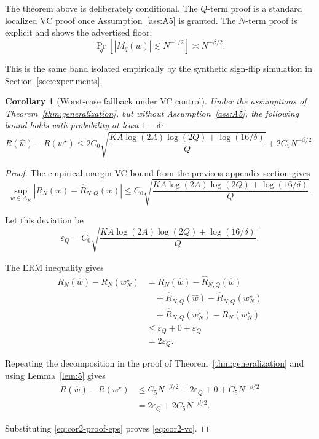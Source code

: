 \documentclass{article} %
\newtheorem{corollary}[theorem]{Corollary}
\providecommand{\simplex}{\Delta_K}
\providecommand{\Risk}{R}
\providecommand{\what}{\widehat{w}}
\providecommand{\wstar}{w^{\star}}
\begin{document}
The theorem above is deliberately conditional.  The \(Q\)-term proof is a
standard localized VC proof once Assumption~\ref{ass:A5} is granted.  The
\(N\)-term proof is explicit and shows the advertised floor:
\begin{equation}
\label{eq:app2-floor-summary}
\Pr_q\!\left[|M_q(w)|\lesssim N^{-1/2}\right]
\asymp
N^{-\beta/2}.
\end{equation}

This is the same band isolated empirically by the synthetic sign-flip simulation
in Section~\ref{sec:experiments}.

\begin{corollary}[Worst-case fallback under VC control]
\label{cor:app2-vc-fallback}
Under the assumptions of Theorem~\ref{thm:generalization}, but without
Assumption~\ref{ass:A5}, the following bound holds with probability at least
\(1-\delta\):
\begin{equation}
\label{eq:cor2-vc}
\Risk(\what)-\Risk(\wstar)
\le
2C_0
\sqrt{
\frac{
KA\log(2A)\log(2Q)+\log(16/\delta)
}{Q}
}
+
2C_5N^{-\beta/2}.
\end{equation}
\end{corollary}

\begin{proof}
The empirical-margin VC bound from the previous appendix section gives
\begin{equation}
\label{eq:cor2-proof-vc}
\sup_{w\in\simplex}
|\Risk_N(w)-\widehat{\Risk}_{N,Q}(w)|
\le
C_0
\sqrt{
\frac{
KA\log(2A)\log(2Q)+\log(16/\delta)
}{Q}
}.
\end{equation}

Let this deviation be
\begin{equation}
\label{eq:cor2-proof-eps}
\varepsilon_Q
=
C_0
\sqrt{
\frac{
KA\log(2A)\log(2Q)+\log(16/\delta)
}{Q}
}.
\end{equation}

The ERM inequality gives
\begin{align}
\Risk_N(\what)-\Risk_N(w_N^\star)
&=
\Risk_N(\what)-\widehat{\Risk}_{N,Q}(\what)
\label{eq:cor2-proof-a}
\\
&\quad+
\widehat{\Risk}_{N,Q}(\what)-\widehat{\Risk}_{N,Q}(w_N^\star)
\label{eq:cor2-proof-b}
\\
&\quad+
\widehat{\Risk}_{N,Q}(w_N^\star)-\Risk_N(w_N^\star)
\label{eq:cor2-proof-c}
\\
&\le
\varepsilon_Q+0+\varepsilon_Q
\label{eq:cor2-proof-d}
\\
&=
2\varepsilon_Q .
\label{eq:cor2-proof-e}
\end{align}

Repeating the decomposition in the proof of Theorem~\ref{thm:generalization}
and using Lemma~\ref{lem:5} gives
\begin{align}
\Risk(\what)-\Risk(\wstar)
&\le
C_5N^{-\beta/2}
+
2\varepsilon_Q
+
0
+
C_5N^{-\beta/2}
\label{eq:cor2-proof-f}
\\
&=
2\varepsilon_Q+2C_5N^{-\beta/2}.
\label{eq:cor2-proof-g}
\end{align}

Substituting \eqref{eq:cor2-proof-eps} proves \eqref{eq:cor2-vc}.
\end{proof}
\end{document}
